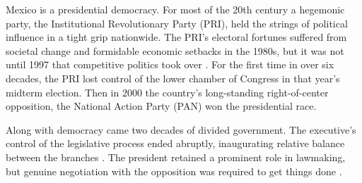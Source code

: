 \documentclass[letter,12pt]{article}
\begin{document}






Mexico is a presidential democracy. For most of the 20th century a hegemonic party, the Institutional Revolutionary Party (PRI), held the strings of political influence in a tight grip nationwide. The PRI's electoral fortunes suffered from societal change and formidable economic setbacks in the 1980s, but it was not until 1997 that competitive politics took over \citep{scott.1959,cosio.villegas.1981,molinar.1991a,cornelius.1996}. For the first time in over six decades, the PRI lost control of the lower chamber of Congress in that year's midterm election. Then in 2000 the country's long-standing right-of-center opposition, the National Action Party (PAN) won the presidential race.  

Along with democracy came two decades of divided government. The executive's control of the legislative process ended abruptly, inaugurating relative balance between the branches \citep{weldon.1997,lujambio.1996}. The president retained a prominent role in lawmaking, but genuine negotiation with the opposition was required to get things done \citep{casarSinMay2013,bejarQuienLegisla2012}. 
\end{document}
